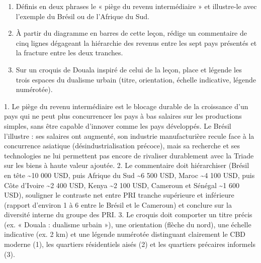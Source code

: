 \documentclass[11pt]{article}
\begin{document}
\begin{exercice}
\begin{enumerate}
\item Définis en deux phrases le « piège du revenu intermédiaire » et illustre-le avec l'exemple du Brésil ou de l'Afrique du Sud.
\item À partir du diagramme en barres de cette leçon, rédige un commentaire de cinq lignes dégageant la hiérarchie des revenus entre les sept pays présentés et la fracture entre les deux tranches.
\item Sur un croquis de Douala inspiré de celui de la leçon, place et légende les trois espaces du dualisme urbain (titre, orientation, échelle indicative, légende numérotée).
\end{enumerate}
\end{exercice}

\begin{corrige}[Exercice]
1. Le piège du revenu intermédiaire est le blocage durable de la croissance d'un pays qui ne peut plus concurrencer les pays à bas salaires sur les productions simples, sans être capable d'innover comme les pays développés. Le Brésil l'illustre : ses salaires ont augmenté, son industrie manufacturière recule face à la concurrence asiatique (désindustrialisation précoce), mais sa recherche et ses technologies ne lui permettent pas encore de rivaliser durablement avec la Triade sur les biens à haute valeur ajoutée.
2. Le commentaire doit hiérarchiser (Brésil en tête \textasciitilde 10 000 USD, puis Afrique du Sud \textasciitilde 6 500 USD, Maroc \textasciitilde 4 100 USD, puis Côte d'Ivoire \textasciitilde 2 400 USD, Kenya \textasciitilde 2 100 USD, Cameroun et Sénégal \textasciitilde 1 600 USD), souligner le contraste net entre PRI tranche supérieure et inférieure (rapport d'environ 1 à 6 entre le Brésil et le Cameroun) et conclure sur la diversité interne du groupe des PRI.
3. Le croquis doit comporter un titre précis (ex. « Douala : dualisme urbain »), une orientation (flèche du nord), une échelle indicative (ex. 2 km) et une légende numérotée distinguant clairement le CBD moderne (1), les quartiers résidentiels aisés (2) et les quartiers précaires informels (3).
\end{corrige}
\end{document}
